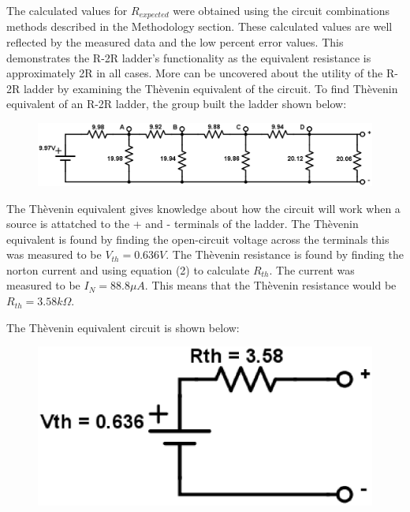 \documentclass[twocolumn, amsmath]{revtex4}
\begin{document}
The calculated values for $R_{expected}$ were obtained using the circuit combinations methods described in the Methodology section. These calculated values are well reflected by the measured data and the low percent error values.  This demonstrates the R-2R ladder's functionality as the equivalent resistance is approximately 2R in all cases. More can be uncovered about the utility of the R-2R ladder by examining the Th\`{e}venin equivalent of the circuit. To find Th\`{e}venin equivalent of an R-2R ladder, the group built the ladder shown below:

\begin{figure}[h]  

\includegraphics[scale = 0.2]{ladderthevenin.eps}  

\end{figure}

The Th\`{e}venin equivalent gives knowledge about how the circuit will work when a source is attatched to the + and - terminals of the ladder. The Th\`{e}venin equivalent is found by finding the open-circuit voltage across the terminals this was measured to be $V_{th} = 0.636V$. The Th\`{e}venin resistance is found by finding the norton current and using equation (2) to calculate $R_{th}$. The current was measured to be $I_N = 88.8\mu A$. This means that the Th\`{e}venin resistance would be $R_{th} = 3.58k\Omega$.

The Th\`{e}venin equivalent circuit is shown below:

\begin{figure}[h]  

\includegraphics[scale = 0.4]{theveq.eps}  

\end{figure}
\end{document}
